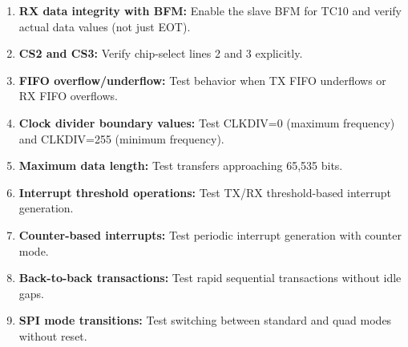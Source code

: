 \begin{enumerate}[leftmargin=2em]
  \item \textbf{RX data integrity with BFM:} Enable the slave BFM for TC10 and verify actual
        data values (not just EOT).
  \item \textbf{CS2 and CS3:} Verify chip-select lines 2 and 3 explicitly.
  \item \textbf{FIFO overflow/underflow:} Test behavior when TX FIFO underflows or RX FIFO overflows.
  \item \textbf{Clock divider boundary values:} Test CLKDIV=0 (maximum frequency) and CLKDIV=255
        (minimum frequency).
  \item \textbf{Maximum data length:} Test transfers approaching 65,535 bits.
  \item \textbf{Interrupt threshold operations:} Test TX/RX threshold-based interrupt generation.
  \item \textbf{Counter-based interrupts:} Test periodic interrupt generation with counter mode.
  \item \textbf{Back-to-back transactions:} Test rapid sequential transactions without idle gaps.
  \item \textbf{SPI mode transitions:} Test switching between standard and quad modes without reset.
\end{enumerate}
